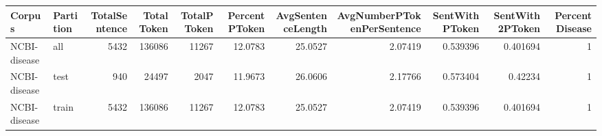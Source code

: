 \begin{tabular}{llrrrrrrrrr}
\hline
 Corpus       & Partition   &   TotalSentence &   TotalToken &   TotalPToken &   PercentPToken &   AvgSentenceLength &   AvgNumberPTokenPerSentence &   SentWithPToken &   SentWith2PToken &   PercentDisease \\
\hline
 NCBI-disease & all         &            5432 &       136086 &         11267 &         12.0783 &             25.0527 &                      2.07419 &         0.539396 &          0.401694 &                1 \\
 NCBI-disease & test        &             940 &        24497 &          2047 &         11.9673 &             26.0606 &                      2.17766 &         0.573404 &          0.42234  &                1 \\
 NCBI-disease & train       &            5432 &       136086 &         11267 &         12.0783 &             25.0527 &                      2.07419 &         0.539396 &          0.401694 &                1 \\
\hline
\end{tabular}